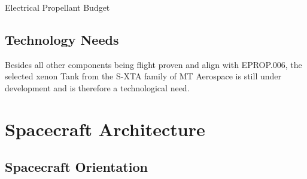 \documentclass[conference]{IEEEtran}
\begin{document}
\begin{table}[H]
\centering
\caption{Electrical Propellant Budget}
\label{tab:budget-prop-el}
\end{table}

\subsection{Technology Needs}
Besides all other components being flight proven and align with EPROP.006, the selected xenon Tank from the S-XTA family of MT Aerospace is still under development and is therefore a technological need.


\section{Spacecraft Architecture}

\subsection{Spacecraft Orientation}
\end{document}
